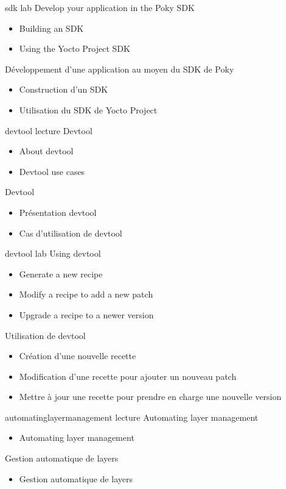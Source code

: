 {sdk}
{lab}
{Develop your application in the Poky SDK}
{
  \begin{itemize}
  \item Building an SDK
  \item Using the Yocto Project SDK
  \end{itemize}
}
{Développement d'une application au moyen du SDK de Poky}
{
  \begin{itemize}
  \item Construction d'un SDK
  \item Utilisation du SDK de Yocto Project
  \end{itemize}
}

{devtool}
{lecture}
{Devtool}
{
  \begin{itemize}
  \item About devtool
  \item Devtool use cases
  \end{itemize}
}
{Devtool}
{
  \begin{itemize}
  \item Présentation devtool
  \item Cas d'utilisation de devtool
  \end{itemize}
}

{devtool}
{lab}
{Using devtool}
{
  \begin{itemize}
  \item Generate a new recipe
  \item Modify a recipe to add a new patch
  \item Upgrade a recipe to a newer version
  \end{itemize}
}
{Utilisation de devtool}
{
  \begin{itemize}
  \item Création d'une nouvelle recette
  \item Modification d'une recette pour ajouter un nouveau patch
  \item Mettre à jour une recette pour prendre en charge une nouvelle version
  \end{itemize}
}

{automatinglayermanagement}
{lecture}
{Automating layer management}
{
  \begin{itemize}
  \item Automating layer management
  \end{itemize}
}
{Gestion automatique de layers}
{
  \begin{itemize}
  \item Gestion automatique de layers
  \end{itemize}
}

